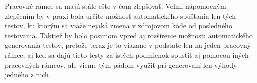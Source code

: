 \documentclass[11pt,twoside,slovak,a4paper]{article}
\begin{document}
	Pracovné rámce sa majú stále ešte v čom zlepšovať. Veľmi nápomocným zlepšením by v praxi bola určite možnosť automatického spúšťania len tých testov, ku ktorým sa viaže nejaká zmena v zdrojovom kóde od posledného testovania. Taktiež by bolo posunom vpred aj rozšírenie možnosti automatického generovania testov, pretože teraz je to viazané v podstate len na jeden pracovný rámec, aj keď sa dajú tieto testy za istých podmienok spustiť aj pomocou iných pracovných rámcov, ale vieme tým pádom využiť pri generovaní len výhody jedného z nich. 

	
	
	
\end{document}
